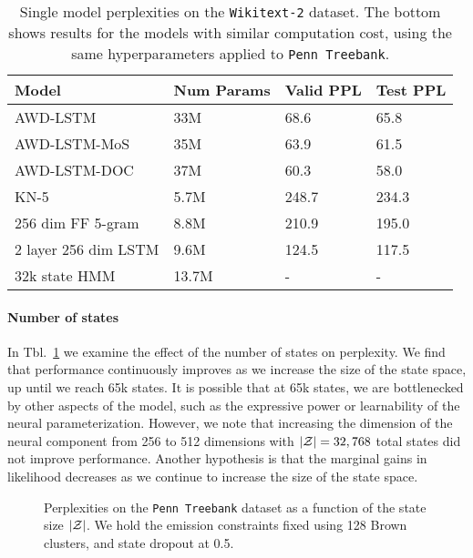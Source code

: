 \documentclass[11pt,a4paper]{article}
\begin{document}
\begin{table*}[!t]
\centering
\begin{tabular}{llll}
\toprule
Model & Num Params & Valid PPL & Test PPL\\
\midrule
AWD-LSTM \citep{merity2017awdlstm} & 33M & 68.6 & 65.8\\
AWD-LSTM-MoS \citep{mos} & 35M & 63.9 & 61.5\\
AWD-LSTM-DOC \citep{awddoc} & 37M & 60.3 & 58.0\\
KN-5              & 5.7M       & 248.7 & 234.3\\
\midrule
256 dim FF 5-gram        & 8.8M    & 210.9  & 195.0\\
2 layer 256 dim LSTM     & 9.6M    & 124.5  & 117.5\\
32k state HMM            & 13.7M   & -      & -\\
\bottomrule
\end{tabular}
\caption{\label{tbl:wt2-ppl}
Single model perplexities on the \texttt{Wikitext-2} dataset.
The bottom shows results for the models with 
similar computation cost, using the same
hyperparameters applied to \texttt{Penn Treebank}.
}
\end{table*}

\paragraph{Number of states}
In Tbl.~\ref{tbl:states-ablation} we examine the effect of the 
number of states on perplexity.
We find that performance continuously improves as we increase
the size of the state space, up until we reach 65k states.
It is possible that at 65k states, we are bottlenecked by
other aspects of the model, such as the expressive power
or learnability of the neural parameterization. 
However, we note that increasing the dimension of the neural component from 256 to
512 dimensions with $|\mathcal{Z}| = 32,768$ total states did not improve performance.
Another hypothesis is that the marginal gains in likelihood
decreases as we continue to increase the size of the state space.

\begin{figure}[!t]
\centering
{}
\caption{\label{tbl:states-ablation}
Perplexities on the \texttt{Penn Treebank} dataset
as a function of the state size $|\mathcal{Z}|$.
We hold the emission constraints fixed using 128 Brown clusters,
and state dropout at 0.5.
}
\end{figure}
\end{document}
